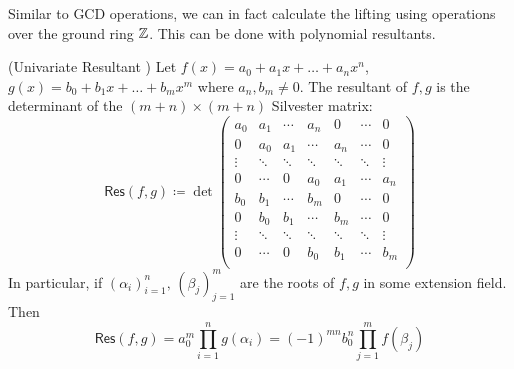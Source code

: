 Similar to GCD operations, we can in fact calculate the lifting using operations over the ground ring \(\mathbb{Z}\). This can be done with polynomial resultants.
\begin{definition}{(Univariate Resultant \cite{MISC:WikiResultant})} \label{def:Resultant}
    Let \(f(x) = a_0 + a_1 x + \ldots + a_n x^n\), \(g(x) = b_0 + b_1 x + \ldots + b_m x^m\) where \(a_n, b_m \neq 0\). The resultant of \(f, g\) is the determinant of the \((m+n)\times(m+n)\) Silvester matrix:
    \[\mathsf{Res}(f, g) \coloneq \det
        \begin{pmatrix}
            a_0 & a_1 & \cdots & a_n & 0 & \cdots & 0 \\
            0 & a_0 & a_1 & \cdots & a_n & \cdots & 0 \\
            \vdots & \ddots & \ddots & \ddots & \ddots & \ddots & \vdots \\
            0 & \cdots & 0 & a_0 & a_1 & \cdots & a_n \\
            b_0 & b_1 & \cdots & b_m & 0 & \cdots & 0 \\
            0 & b_0 & b_1 & \cdots & b_m & \cdots & 0 \\
            \vdots & \ddots & \ddots & \ddots & \ddots & \ddots & \vdots \\
            0 & \cdots & 0 & b_0 & b_1 & \cdots & b_m \\
            \end{pmatrix}
    \]
    In particular, if \((\alpha_i)_{i=1}^n,\, (\beta_j)_{j=1}^m\) are the roots of \(f, g\) in some extension field. Then
    \[\mathsf{Res}(f,g) = a_0^m \prod_{i=1}^{n}g(\alpha_i) = (-1)^{mn}b_0^n \prod_{j=1}^{m} f(\beta_j)\]
\end{definition}

